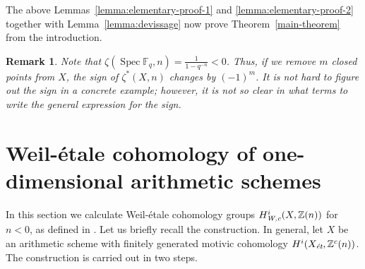 \documentclass[draft]{article}
\DeclareMathOperator{\Spec}{Spec}
\newcommand{\FF}{\mathbb{F}}
\newcommand{\ZZ}{\mathbb{Z}}
\newcommand{\et}{\text{\it \'{e}t}}
\newcommand{\Wc}{\text{\it W,c}}
\theoremstyle{myplain}
\theoremstyle{mydefinition}
\newtheorem{remark}[theorem]{Remark}
\begin{document}
The above Lemmas~\ref{lemma:elementary-proof-1} and
\ref{lemma:elementary-proof-2} together with Lemma~\ref{lemma:devissage} now
prove Theorem~\ref{main-theorem} from the introduction.

\begin{remark}
  Note that $\zeta (\Spec \FF_q, n) = \frac{1}{1 - q^{-n}} < 0$. Thus, if we
  remove $m$ closed points from $X$, the sign of $\zeta^* (X,n)$ changes by
  $(-1)^m$. It is not hard to figure out the sign in a concrete example;
  however, it is not so clear in what terms to write the general expression for
  the sign.
\end{remark}


\section{Weil-\'{e}tale cohomology of one-dimensional arithmetic schemes}
\label{sec:Weil-etale-cohomology-of-X}

In this section we calculate Weil-\'{e}tale cohomology groups $H^i_\Wc (X, \ZZ(n))$
for $n < 0$, as defined in \cite{Beshenov-Weil-etale-1}. Let us briefly recall
the construction. In general, let $X$ be an arithmetic scheme with finitely
generated motivic cohomology $H^i (X_\et, \ZZ^c(n))$. The construction is
carried out in two steps.
\end{document}
